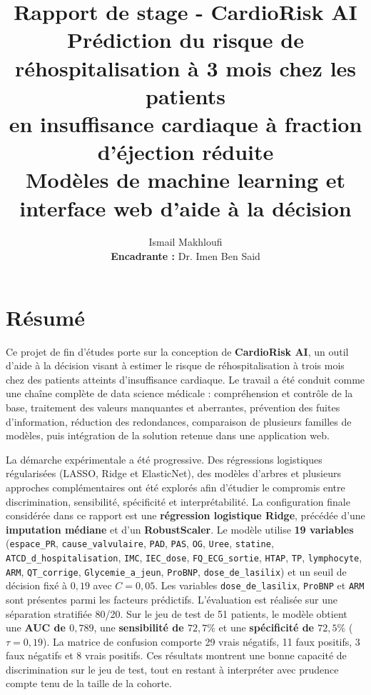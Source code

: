 \documentclass[12pt,a4paper]{report}
\title{\textbf{Rapport de stage - CardioRisk AI} \\
\large Prédiction du risque de réhospitalisation à 3 mois chez les patients \\
en insuffisance cardiaque à fraction d'éjection réduite \\
\large Modèles de machine learning et interface web d'aide à la décision}
\author{Ismail Makhloufi\\[0.4cm]
\textbf{Encadrante :} Dr. Imen Ben Said}
\date{}
\begin{document}
\maketitle

\chapter*{Résumé}
Ce projet de fin d'études porte sur la conception de \textbf{CardioRisk AI}, un outil
d'aide à la décision visant à estimer le risque de réhospitalisation à trois mois chez des
patients atteints d'insuffisance cardiaque. Le travail a été conduit comme une chaîne
complète de data science médicale : compréhension et contrôle de la base, traitement des
valeurs manquantes et aberrantes, prévention des fuites d'information, réduction des
redondances, comparaison de plusieurs familles de modèles, puis intégration de la solution
retenue dans une application web.

La démarche expérimentale a été progressive. Des régressions logistiques régularisées
(LASSO, Ridge et ElasticNet), des modèles d'arbres et plusieurs approches complémentaires
ont été explorés afin d'étudier le compromis entre discrimination, sensibilité,
spécificité et interprétabilité. La configuration finale considérée dans ce rapport est une
\textbf{régression logistique Ridge}, précédée d'une \textbf{imputation médiane}
et d'un \textbf{RobustScaler}. Le modèle utilise \textbf{19 variables} (\texttt{espace\_PR}, \texttt{cause\_valvulaire}, \texttt{PAD}, \texttt{PAS}, \texttt{OG}, \texttt{Uree}, \texttt{statine}, \texttt{ATCD\_d\_hospitalisation}, \texttt{IMC}, \texttt{IEC\_dose}, \texttt{FQ\_ECG\_sortie}, \texttt{HTAP}, \texttt{TP}, \texttt{lymphocyte}, \texttt{ARM}, \texttt{QT\_corrige}, \texttt{Glycemie\_a\_jeun}, \texttt{ProBNP}, \texttt{dose\_de\_lasilix}) et un seuil de
décision fixé à $0{,}19$ avec $C=0{,}05$. Les variables \texttt{dose\_de\_lasilix}, \texttt{ProBNP} et \texttt{ARM} sont présentes parmi les facteurs prédictifs. L'évaluation est réalisée sur une séparation stratifiée 80/20. Sur le jeu de test de
51 patients, le modèle obtient une \textbf{AUC de $0{,}789$}, une \textbf{sensibilité de $72{,}7\%$} et une \textbf{spécificité de
$72{,}5\%$} ($\tau=0{,}19$). La matrice de confusion comporte 29 vrais négatifs, 11 faux positifs, 3 faux
négatifs et 8 vrais positifs. Ces résultats montrent une bonne capacité de discrimination
sur le jeu de test, tout en restant à interpréter avec prudence compte tenu de la taille de
la cohorte.
\end{document}
